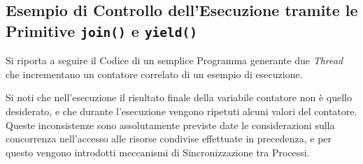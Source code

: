 \subsection{Esempio di Controllo dell'Esecuzione tramite le Primitive \texttt{join()} e \texttt{yield()}}
Si riporta a seguire il Codice di un semplice Programma generante due \textit{Thread} che incrementano un contatore correlato di un esempio di esecuzione.

Si noti che nell'esecuzione il risultato finale della variabile contatore non è quello desiderato, e che durante l'esecuzione vengono ripetuti alcuni valori del contatore. Queste inconsistenze sono assolutamente previste date le considerazioni sulla concorrenza nell'accesso alle risorse condivise effettuate in precedenza, e per questo vengono introdotti meccanismi di Sincronizzazione tra Processi.
